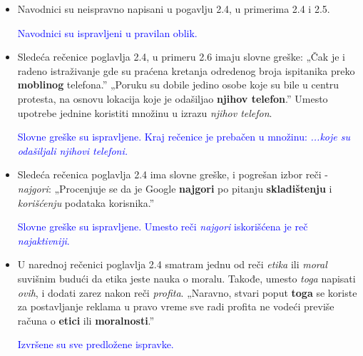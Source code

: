 \documentclass[a4paper]{report}
\newcommand{\odgovor}[1]{\textcolor{blue}{#1}}
\begin{document}
\begin{itemize}
    \item  Navodnici su neispravno napisani u pogavlju 2.4, u primerima 2.4 i 2.5.
    
    \odgovor{Navodnici su ispravljeni u pravilan oblik.}
    
\end{itemize}
\begin{itemize}
    \item Sledeća rečenice poglavlja 2.4, u primeru 2.6 imaju slovne greške: \newline
    „Čak je i radeno istraživanje gde su praćena kretanja odredenog broja ispitanika preko \textbf{moblinog} telefona.”
    „Poruku su dobile jedino osobe koje su bile u centru protesta, na osnovu lokacija koje je odašiljao \textbf{njihov telefon}.”\newline
    Umesto upotrebe jednine koristiti množinu u izrazu \textit{njihov telefon}.
    
    \odgovor{Slovne greške su ispravljene. Kraj rečenice je prebačen u množinu: \textit{...koje su odašiljali njihovi telefoni.}}
    
\end{itemize}
\begin{itemize}
    \item Sledeća rečenica poglavlja 2.4 ima slovne greške, i pogrešan izbor reči -  \textit{najgori}:\newline
    „Procenjuje se da je Google \textbf{najgori} po pitanju \textbf{skladištenju} i \textit{korišćenju} podataka korisnika.”
    
    \odgovor{Slovne greške su ispravljene. Umesto reči \textit{najgori} iskorišćena je reč \textit{najaktivniji}.}
    
\end{itemize}
\begin{itemize}
    \item U narednoj rečenici poglavlja 2.4 smatram jednu od reči \textit{etika} ili \textit{moral} suvišnim budući da etika jeste nauka o moralu. Takođe, umesto \textit{toga} napisati \textit{ovih}, i dodati zarez nakon reči \textit{profita}.
    \newline
    „Naravno, stvari poput \textbf{toga} se koriste za postavljanje reklama u pravo vreme sve radi profita ne vodeći previše računa o \textbf{etici} ili \textbf{moralnosti}.”
    
    \odgovor{Izvršene su sve predložene ispravke.}
    
\end{itemize}
\end{document}
